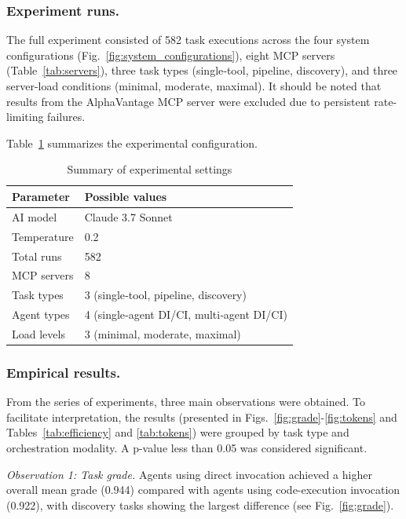 \documentclass[runningheads]{llncs}
\begin{document}
\subsubsection{Experiment runs.} The full experiment consisted of 582 task executions across the four system configurations (Fig.~\ref{fig:system_configurations}), eight MCP servers (Table~\ref{tab:servers}), three task types (single‑tool, pipeline, discovery), and three server-load conditions (minimal, moderate, maximal). It should be noted that results from the AlphaVantage MCP server were excluded due to persistent rate-limiting failures. 

Table~\ref{tab:config} summarizes the experimental configuration.

\begin{table}[H]
\caption{Summary of experimental settings}\label{tab:config}
\centering
\begin{tabular}{|l|l|}
\hline
\textbf{Parameter} & \textbf{Possible values} \\
\hline
AI model      & Claude 3.7 Sonnet \\
Temperature   & 0.2 \\
Total runs    & 582 \\
MCP servers   & 8 \\
Task types    & 3 (single‑tool, pipeline, discovery) \\
Agent types   & 4 (single‑agent DI/CI, multi‑agent DI/CI) \\
Load levels   & 3 (minimal, moderate, maximal) \\
\hline
\end{tabular}
\end{table}

\subsubsection{Empirical results.} From the series of experiments, three main observations were obtained. To facilitate interpretation, the results (presented in Figs.~\ref{fig:grade}-\ref{fig:tokens} and Tables~\ref{tab:efficiency} and \ref{tab:tokens}) were grouped by task type and orchestration modality. A p-value less than 0.05 was considered significant. 

\textit{Observation 1: Task grade.} Agents using direct invocation achieved a higher overall mean grade (0.944) compared with agents using code-execution invocation (0.922), with discovery tasks showing the largest difference (see Fig.~\ref{fig:grade}).
\end{document}
